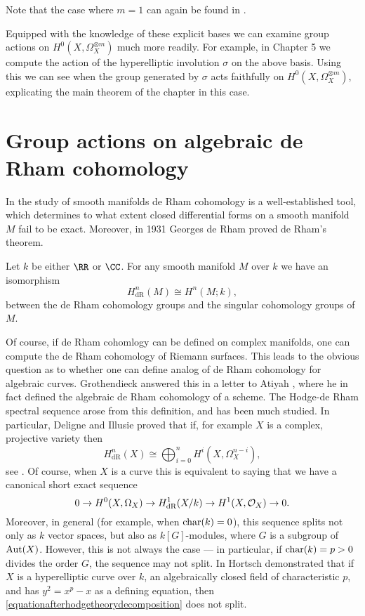 Note that the case where $m=1$ can again be found in \cite[Prop. 7.4.26]{liu}.

Equipped with the knowledge of these explicit bases we can examine group actions on $H^0(X,\Omega_X^{\otimes m})$ much more readily.
For example, in Chapter 5 we compute the action of the hyperelliptic involution $\sigma$ on the above basis.
Using this we can see when the group generated by $\sigma$ acts faithfully on $H^0(X,\Omega_X^{\otimes m})$, explicating the main theorem of the chapter in this case.

\section{Group actions on algebraic de Rham cohomology}

In the study of smooth manifolds de Rham cohomology is a well-established tool, which determines to what extent closed differential forms on a smooth manifold $M$ fail to be exact.
Moreover, in 1931 Georges de Rham \cite{derhamstheorem} proved de Rham's theorem.
    \begin{unnumthm}
    Let $k$ be either $\RR$ or $\CC$.
    For any smooth manifold $M$ over $k$ we have an isomorphism
        \[
        H^n_{\text{dR}}(M) \cong H^n(M;k),
        \]
    between the de Rham cohomology groups and the singular cohomology groups of $M$.
    \end{unnumthm}

Of course, if de Rham cohomlogy can be defined on complex manifolds, one can compute the de Rham cohomology of Riemann surfaces.
This leads to the obvious question as to whether one can define analog of de Rham cohomology for algebraic curves.
Grothendieck answered this in a letter to Atiyah \cite{grothendiecklettertoatiyah}, where he in fact defined the algebraic de Rham cohomology of a scheme.
The Hodge-de Rham spectral sequence arose from this definition, and has been much studied.
In particular, Deligne and Illusie proved that if, for example $X$ is a complex, projective variety then
    \begin{equation}\label{equationhodgetheorydecomposition}
    H^n_{\text{dR}}(X) \cong \bigoplus_{i=0}^n H^i(X,\Omega_X^{n-i}),
    \end{equation}
see \cite{deligneillusie}.
Of course, when $X$ is a curve this is equivalent to saying that we have a canonical short exact sequence
    \begin{equation}\label{equationafterhodgetheorydecomposition}
    0 \rightarrow {H^0(X,\Omega_X)} \rightarrow H_{\text {dR}}^1(X/k) \rightarrow H^1(X,\mathcal{O}_X) \rightarrow 0.
    \end{equation}
Moreover, in general (for example, when $\operatorname{char}(k) = 0$), this sequence splits not only as $k$ vector spaces, but also as $k[G]$-modules, where $G$ is a subgroup of $\operatorname{Aut}(X)$.
However, this is not always the case --- in particular, if $\operatorname{char}(k) = p >0$ divides the order $G$, the sequence may not split.
In \cite{canonicalrepresentation} Hortsch demonstrated that if $X$ is a hyperelliptic curve over $k$, an algebraically closed field of characteristic $p$, and has $y^2 = x^p-x$ as a defining equation, then \eqref{equationafterhodgetheorydecomposition} does not split.

